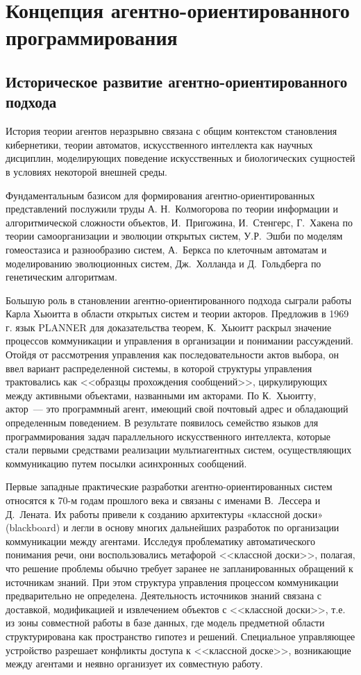 \section{Концепция агентно-ориентированного программирования}
\subsection{Историческое развитие агентно-ориентированного подхода}
История теории агентов неразрывно связана с общим контекстом становления кибернетики, теории автоматов, искусственного интеллекта как научных дисциплин, моделирующих поведение искусственных и биологических сущностей в условиях некоторой внешней среды.

Фундаментальным базисом для формирования агентно-ориентированных представлений послужили труды А. Н.~Колмогорова по теории информации и алгоритмической сложности объектов, И.~Пригожина, И.~Стенгерс, Г.~Хакена по теории самоорганизации и эволюции открытых систем, У.Р.~Эшби по моделям гомеостазиса и разнообразию систем, А.~Беркса по клеточным автоматам и моделированию эволюционных систем, Дж.~Холланда и Д.~Гольдберга по генетическим алгоритмам.

Большую роль в становлении агентно-ориентированного подхода сыграли работы Карла Хьюитта в области открытых систем и теории акторов. Предложив в 1969 г. язык PLANNER для доказательства теорем, К.~Хьюитт раскрыл значение процессов коммуникации и управления в организации и понимании рассуждений. Отойдя от рассмотрения управления как последовательности актов выбора, он ввел вариант распределенной системы, в которой структуры управления трактовались как <<образцы прохождения сообщений>>, циркулирующих между активными объектами, названными им акторами. По К.~Хьюитту, актор~--- это программный агент, имеющий свой почтовый адрес и обладающий определенным поведением. В результате появилось семейство языков для программирования задач параллельного искусственного интеллекта, которые стали первыми средствами реализации мультиагентных систем, осуществляющих коммуникацию путем посылки асинхронных сообщений.

Первые западные практические разработки агентно-ориентированных систем  относятся к 70-м годам прошлого века и связаны с именами В.~Лессера и Д.~Лената. Их работы привели к созданию архитектуры «классной доски» (blackboard) и легли в основу многих дальнейших разработок по организации коммуникации между агентами. Исследуя проблематику автоматического понимания речи, они воспользовались метафорой <<классной доски>>, полагая, что решение проблемы обычно требует заранее не запланированных обращений к источникам знаний. При этом структура управления процессом коммуникации предварительно не определена. Деятельность источников знаний связана с доставкой, модификацией и извлечением объектов с <<классной доски>>, т.е. из зоны совместной работы в базе данных, где модель предметной области структурирована как пространство гипотез и решений. Специальное управляющее устройство разрешает конфликты доступа к <<классной доске>>, возникающие между агентами и неявно организует их совместную работу.

